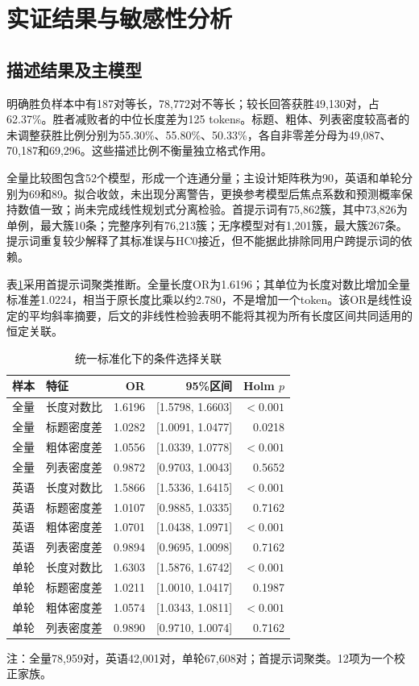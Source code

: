 \documentclass[UTF8,11pt,a4paper,fontset=windows]{ctexart}
\numberwithin{equation}{section}
\begin{document}
\section{实证结果与敏感性分析}
\subsection{描述结果及主模型}
明确胜负样本中有187对等长，78,772对不等长；较长回答获胜49,130对，占62.37\%。胜者减败者的中位长度差为125 tokens。标题、粗体、列表密度较高者的未调整获胜比例分别为55.30\%、55.80\%、50.33\%，各自非零差分母为49,087、70,187和69,296。这些描述比例不衡量独立格式作用。

全量比较图包含52个模型，形成一个连通分量；主设计矩阵秩为90，英语和单轮分别为69和89。拟合收敛，未出现分离警告，更换参考模型后焦点系数和预测概率保持数值一致；尚未完成线性规划式分离检验。首提示词有75,862簇，其中73,826为单例，最大簇10条；完整序列有76,213簇；无序模型对有1,201簇，最大簇267条。提示词重复较少解释了其标准误与HC0接近，但不能据此排除同用户跨提示词的依赖。

表\ref{tab:reg}采用首提示词聚类推断。全量长度OR为1.6196；其单位为长度对数比增加全量标准差1.0224，相当于原长度比乘以约2.780，不是增加一个token。该OR是线性设定的平均斜率摘要，后文的非线性检验表明不能将其视为所有长度区间共同适用的恒定关联。

\begin{table}[htbp]\centering\small\caption{统一标准化下的条件选择关联}\label{tab:reg}
\begin{tabular}{llrrr}\toprule
样本 & 特征 & OR & 95\%区间 & Holm $p$\\\midrule
全量 & 长度对数比 & 1.6196 & [1.5798, 1.6603] & $<0.001$\\
全量 & 标题密度差 & 1.0282 & [1.0091, 1.0477] & 0.0218\\
全量 & 粗体密度差 & 1.0556 & [1.0339, 1.0778] & $<0.001$\\
全量 & 列表密度差 & 0.9872 & [0.9703, 1.0043] & 0.5652\\
英语 & 长度对数比 & 1.5866 & [1.5336, 1.6415] & $<0.001$\\
英语 & 标题密度差 & 1.0107 & [0.9885, 1.0335] & 0.7162\\
英语 & 粗体密度差 & 1.0701 & [1.0438, 1.0971] & $<0.001$\\
英语 & 列表密度差 & 0.9894 & [0.9695, 1.0098] & 0.7162\\
单轮 & 长度对数比 & 1.6303 & [1.5876, 1.6742] & $<0.001$\\
单轮 & 标题密度差 & 1.0211 & [1.0010, 1.0417] & 0.1987\\
单轮 & 粗体密度差 & 1.0574 & [1.0343, 1.0811] & $<0.001$\\
单轮 & 列表密度差 & 0.9890 & [0.9710, 1.0074] & 0.7162\\\bottomrule\end{tabular}
\par\smallskip\footnotesize 注：全量78,959对，英语42,001对，单轮67,608对；首提示词聚类。12项为一个校正家族。
\end{table}
\end{document}
